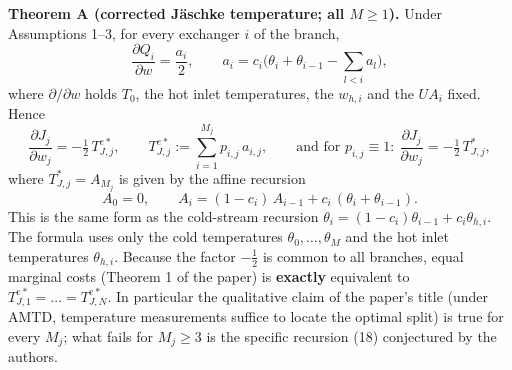 \documentclass[11pt,a4paper]{report}
\begin{document}
\textbf{Theorem A (corrected Jäschke temperature; all \(M \ge 1\)).} Under Assumptions 1--3, for every exchanger \(i\)
of the branch,
\[\frac{\partial Q_i}{\partial w} = \frac{a_i}{2}, \qquad
   a_i = c_i\Big(\theta_i + \theta_{i-1} - \sum_{l<i} a_l\Big),\]
where \(\partial/\partial w\) holds \(T_0\), the hot inlet temperatures, the \(w_{h,i}\) and the \(UA_i\) fixed. Hence
\[\frac{\partial J_j}{\partial w_j} = -\tfrac12\, T^{e*}_{J,j}, \qquad T^{e*}_{J,j} := \sum_{i=1}^{M_j} p_{i,j}\, a_{i,j},
   \qquad\text{and for } p_{i,j}\equiv 1:\ \frac{\partial J_j}{\partial w_j} = -\tfrac12\, T^*_{J,j},\]
where \(T^*_{J,j} = A_{M_j}\) is given by the affine recursion
\[A_0 = 0, \qquad A_i = (1 - c_i)\,A_{i-1} + c_i\,(\theta_i + \theta_{i-1}).\]
This is the same form as the cold-stream recursion \(\theta_i = (1-c_i)\theta_{i-1} + c_i\theta_{h,i}\). The formula
uses only the cold temperatures \(\theta_0,\dots,\theta_M\) and the hot inlet temperatures \(\theta_{h,i}\). Because the
factor \(-\tfrac12\) is common to all branches, equal marginal costs (Theorem 1 of the paper) is \textbf{exactly}
equivalent to \(T^{e*}_{J,1} = \dots = T^{e*}_{J,N}\). In particular the qualitative claim of the paper's title (under
AMTD, temperature measurements suffice to locate the optimal split) is true for every \(M_j\); what fails for
\(M_j \ge 3\) is the specific recursion (18) conjectured by the authors.
\end{document}
